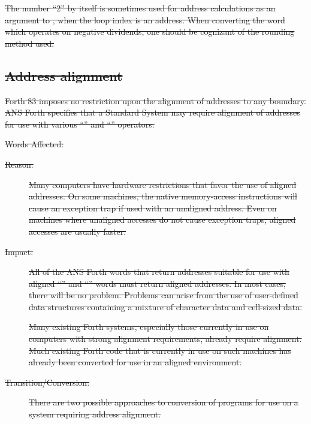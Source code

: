 \sout{%
The number ``2'' by itself is sometimes used for address calculations
as an argument to , when the loop index is an address. When
converting the word  which operates on negative dividends, one
should be cognizant of the rounding method used.}

\subsection[Address alignment]{\sout{Address alignment}} %

\sout{%
Forth 83 imposes no restriction upon the alignment of addresses to
any boundary. ANS Forth specifies that a Standard System may require
alignment of addresses for use with various ``'' and
``\word{!}'' operators.}

\begin{description}
\item[\sout{Words Affected:}]
\sout{%
	\word{!}	\word{+!}			
			\word{,}}

\item[\sout{Reason:}]
\sout{%
	Many computers have hardware restrictions that favor the use of
	aligned addresses. On some machines, the native memory-access
	instructions will cause an exception trap if used with an
	unaligned address. Even on machines where unaligned accesses do
	not cause exception traps, aligned accesses are usually faster.}

\item[\sout{Impact:}]
\sout{%
	All of the ANS Forth words that return addresses suitable for
	use with aligned ``'' and ``\word{!}'' words must return
	aligned addresses. In most cases, there will be no problem.
	Problems can arise from the use of user-defined data structures
	containing a mixture of character data and cell-sized data.}

\sout{%
	Many existing Forth systems, especially those currently in use on
	computers with strong alignment requirements, already require
	alignment. Much existing Forth code that is currently in use on
	such machines has already been converted for use in an aligned
	environment.}

\item[\sout{Transition/Conversion:}]
\sout{%
	There are two possible approaches to conversion of programs for
	use on a system requiring address alignment.}


\end{description}
